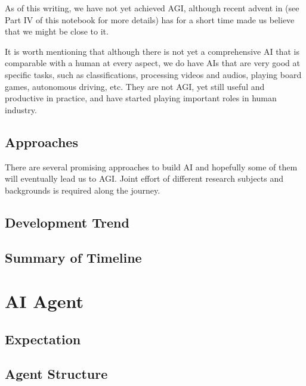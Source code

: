 As of this writing, we have not yet achieved AGI, although recent advent in  (see Part IV of this notebook for more details) has for a short time made us believe that we might be close to it.

It is worth mentioning that although there is not yet a comprehensive AI that is comparable with a human at every aspect, we do have AIs that are very good at specific tasks, such as classifications, processing videos and audios, playing board games, autonomous driving, etc. They are not AGI, yet still useful and productive in practice, and have started playing important roles in human industry.

\subsection{Approaches}

There are several promising approaches to build AI and hopefully some of them will eventually lead us to AGI. Joint effort of different research subjects and backgrounds is required along the journey.

\subsection{Development Trend}

\subsection{Summary of Timeline}

\section{AI Agent}

\subsection{Expectation}

\subsection{Agent Structure}